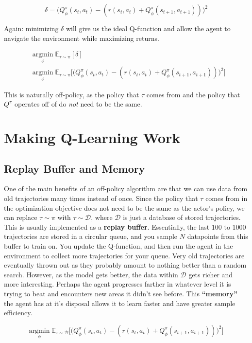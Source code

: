\begin{flushleft}
    $$\delta = \biggl(Q_\phi^\pi(s_t, a_t) - (r(s_t, a_t) + Q_\phi^\pi(s_{t+1}, a_{t+1}))\biggr)^2$$
    
    Again: minimizing $\delta$ will give us the ideal Q-function and allow the agent to navigate the environment while maximizing returns.
    
    \begin{align*}
        & \underset{\phi}{\mathrm{argmin}}\;\mathbb{E}_{\tau \sim \pi}[\delta]\\
        & \underset{\phi}{\mathrm{argmin}}\;\mathbb{E}_{\tau \sim \pi}\biggl[\biggl(Q_\phi^\pi(s_t, a_t) - (r(s_t, a_t) + Q_\phi^\pi(s_{t+1}, a_{t+1}))\biggr)^2\biggr]
    \end{align*}
    
    This is naturally off-policy, as the policy that $\tau$ comes from and the policy that $Q^\pi$ operates off of do \textit{not} need to be the same.
\end{flushleft}

\section{Making Q-Learning Work}
\subsection{Replay Buffer and Memory}
\begin{flushleft}
    \large One of the main benefits of an off-policy algorithm are that we can use data from old trajectories many times instead of once. Since the policy that $\tau$ comes from in the optimization objective does not need to be the same as the actor's policy, we can replace $\tau \sim \pi$ with $\tau \sim \mathcal{D}$, where $\mathcal{D}$ is just a database of stored trajectories. This is usually implemented as a \textbf{replay buffer}. Essentially, the last 100 to 1000 trajectories are stored in a circular queue, and you sample $N$ datapoints from this buffer to train on. You update the Q-function, and then run the agent in the environment to collect more trajectories for your queue. Very old trajectories are eventually thrown out as they probably amount to nothing better than a random search. However, as the model gets better, the data within $\mathcal{D}$ gets richer and more interesting. Perhaps the agent progresses farther in whatever level it is trying to beat and encounters new areas it didn't see before. This \textbf{``memory''} the agent has at it's disposal allows it to learn faster and have greater sample efficiency.

    $$\underset{\phi}{\mathrm{argmin}}\;\mathbb{E}_{\tau \sim \mathcal{D}}\biggl[\biggl(Q_\phi^\pi(s_t, a_t) - (r(s_t, a_t) + Q_\phi^\pi(s_{t+1}, a_{t+1}))\biggr)^2\biggr]$$
\end{flushleft}
